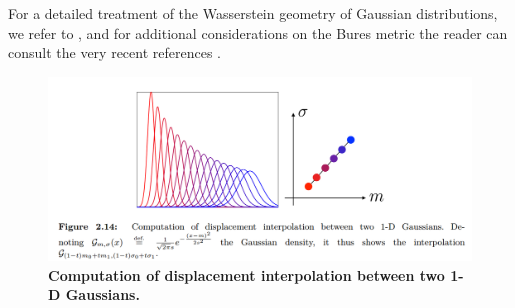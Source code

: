 \documentclass[11pt]{article}
\begin{document}
\begin{itemize}
For a detailed treatment of the Wasserstein geometry of Gaussian distributions, we refer to \citep{takatsu2011wasserstein}, and for additional considerations
on the Bures metric the reader can consult the very recent references \citep{malago2018wasserstein, bhatia2019bures}.

\begin{figure}
\begin{minipage}[t]{1\linewidth}
  \centering
  \centerline{\includegraphics[scale = 0.35]{gaussian_displacement.png}}
\end{minipage}
\caption{\footnotesize{\textbf{Computation of displacement interpolation between two 1-D Gaussians.}}}
\label{fig: gaussian_displacement}
\end{figure}

\end{itemize}

\newpage


\end{document}
